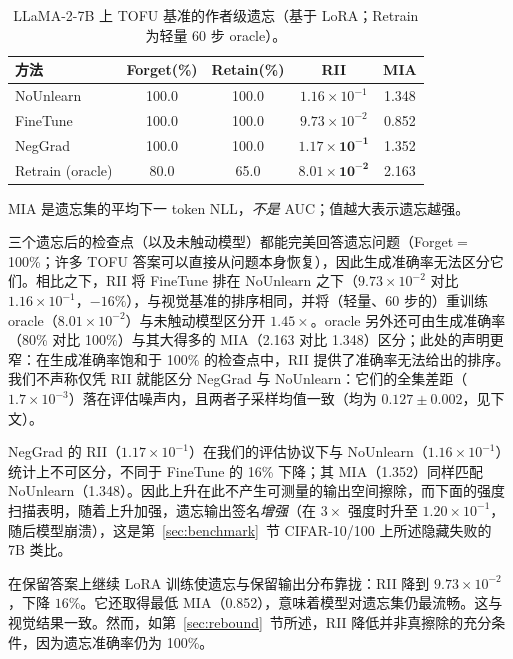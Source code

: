 \begin{table}[t]
\centering
\small
\caption{LLaMA-2-7B 上 TOFU 基准的作者级遗忘（基于 LoRA；Retrain 为轻量 60 步 oracle）。}\label{tab:llm}
\setlength{\tabcolsep}{2pt}
\begin{tabular}{l c c c c}
\toprule
方法 & Forget(\%) & Retain(\%) & RII & MIA \\
\midrule
NoUnlearn & 100.0 & 100.0 & $1.16{\times}10^{-1}$ & 1.348 \\
FineTune & 100.0 & 100.0 & $9.73{\times}10^{-2}$ & 0.852 \\
NegGrad & 100.0 & 100.0 & $\mathbf{1.17{\times}10^{-1}}$ & 1.352 \\
Retrain (oracle) & 80.0 & 65.0 & $\mathbf{8.01{\times}10^{-2}}$ & 2.163 \\
\bottomrule
\end{tabular}
\par\vspace{2pt}\footnotesize MIA 是遗忘集的平均下一 token NLL，\emph{不是} AUC；值越大表示遗忘越强。
\end{table}

三个遗忘后的检查点（以及未触动模型）都能完美回答遗忘问题（Forget$=$100\%；许多 TOFU 答案可以直接从问题本身恢复），因此生成准确率无法区分它们。相比之下，RII 将 FineTune 排在 NoUnlearn 之下（$9.73{\times}10^{-2}$ 对比 $1.16{\times}10^{-1}$，$-16\%$），与视觉基准的排序相同，并将（轻量、60 步的）重训练 oracle（$8.01{\times}10^{-2}$）与未触动模型区分开 $1.45\times$。oracle 另外还可由生成准确率（80\% 对比 100\%）与其大得多的 MIA（2.163 对比 1.348）区分；此处的声明更窄：在生成准确率饱和于 100\% 的检查点中，RII 提供了准确率无法给出的排序。我们不声称仅凭 RII 就能区分 NegGrad 与 NoUnlearn：它们的全集差距（$1.7{\times}10^{-3}$）落在评估噪声内，且两者子采样均值一致（均为 $0.127\pm0.002$，见下文）。

NegGrad 的 RII（$1.17{\times}10^{-1}$）在我们的评估协议下与 NoUnlearn（$1.16{\times}10^{-1}$）统计上不可区分，不同于 FineTune 的 16\% 下降；其 MIA（1.352）同样匹配 NoUnlearn（1.348）。因此上升在此不产生可测量的输出空间擦除，而下面的强度扫描表明，随着上升加强，遗忘输出签名\emph{增强}（在 $3\times$ 强度时升至 $1.20{\times}10^{-1}$，随后模型崩溃），这是第~\ref{sec:benchmark}~节 CIFAR-10/100 上所述隐藏失败的 7B 类比。

在保留答案上继续 LoRA 训练使遗忘与保留输出分布靠拢：RII 降到 $9.73{\times}10^{-2}$，下降 $16\%$。它还取得最低 MIA（0.852），意味着模型对遗忘集仍最流畅。这与视觉结果一致。然而，如第~\ref{sec:rebound}~节所述，RII 降低并非真擦除的充分条件，因为遗忘准确率仍为 100\%。

